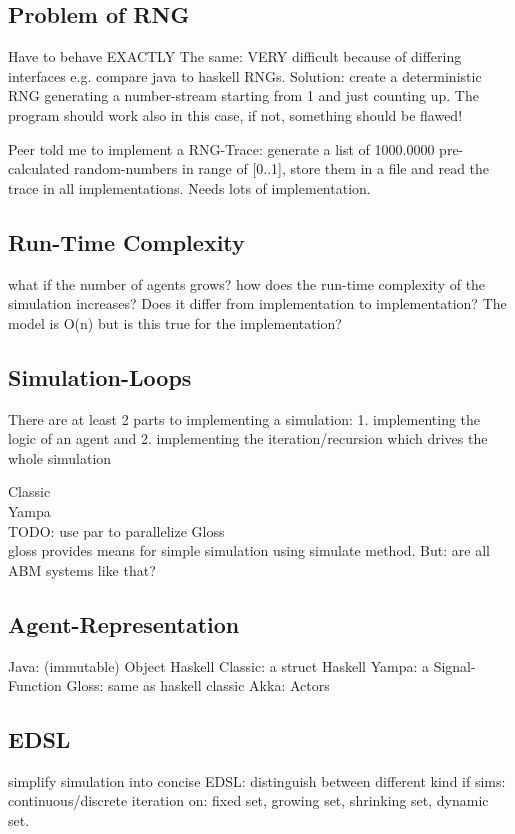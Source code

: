 \subsection{Problem of RNG}
Have to behave EXACTLY The same: VERY difficult because of differing interfaces e.g. compare java to haskell RNGs.
Solution: create a deterministic RNG generating a number-stream starting from 1 and just counting up. The program should work also in this case, if not, something should be flawed!

Peer told me to implement a RNG-Trace: generate a list of 1000.0000 pre-calculated random-numbers in range of [0..1], store them in a file and read the trace in all implementations. Needs lots of implementation.

\subsection{Run-Time Complexity}
what if the number of agents grows? how does the run-time complexity of the simulation increases? Does it differ from implementation to implementation? The model is O(n) but is this true for the implementation?

\subsection{Simulation-Loops}
There are at least 2 parts to implementing a simulation: 1. implementing the logic of an agent and 2. implementing the iteration/recursion which drives the whole simulation

Classic \\
Yampa \\ TODO: use par to parallelize
Gloss \\
gloss provides means for simple simulation using simulate method. But: are all ABM systems like that?

\subsection{Agent-Representation}
Java: (immutable) Object
Haskell Classic: a struct
Haskell Yampa: a Signal-Function
Gloss: same as haskell classic
Akka: Actors

\subsection{EDSL}
simplify simulation into concise EDSL: distinguish between different kind if sims: continuous/discrete iteration on: fixed set, growing set, shrinking set, dynamic set. 